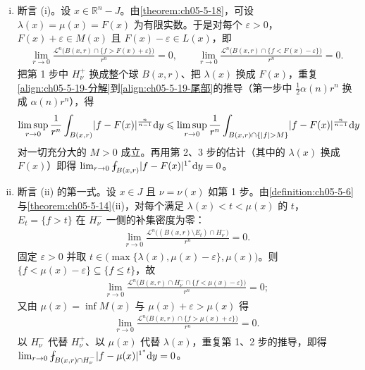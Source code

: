 \documentclass[../../main.tex]{subfiles}%
\begin{document}
\begin{remark}\label{remark:ch05-thm-5-19-论证三}
\begin{enumerate}[(i)]
\item 断言 (i)。设 $x\in\mathbb{R}^n-J$。由\cref{theorem:ch05-5-18}，可设 $\lambda(x)=\mu(x)=F(x)$ 为有限实数。于是对每个 $\varepsilon>0$，$F(x)+\varepsilon\in M(x)$ 且 $F(x)-\varepsilon\in L(x)$，即 %
\begin{align*}
\lim_{r\to0}\frac{\mathcal{L}^n\bigl(B(x,r)\cap\{f>F(x)+\varepsilon\}\bigr)}{r^n}=0,\qquad
\lim_{r\to0}\frac{\mathcal{L}^n\bigl(B(x,r)\cap\{f<F(x)-\varepsilon\}\bigr)}{r^n}=0 .
\end{align*}
把第 1 步中 $H_\nu^+$ 换成整个球 $B(x,r)$、把 $\lambda(x)$ 换成 $F(x)$，重复\eqref{align:ch05-5-19-分解}到\eqref{align:ch05-5-19-尾部}的推导（第一步中 $\frac12\alpha(n)r^n$ 换成 $\alpha(n)r^n$），得
\begin{align*}
\limsup_{r\to0}\frac{1}{r^n}\int_{B(x,r)}\lvert f-F(x)\rvert^{\frac{n}{n-1}}\mathrm{d} y
\leqslant\limsup_{r\to0}\frac{1}{r^n}\int_{B(x,r)\cap\{\lvert f\rvert>M\}}\lvert f-F(x)\rvert^{\frac{n}{n-1}}\mathrm{d} y
\end{align*}
对一切充分大的 $M>0$ 成立。再用第 2、3 步的估计（其中的 $\lambda(x)$ 换成 $F(x)$）即得 $\lim_{r\to0}\fint_{B(x,r)}\lvert f-F(x)\rvert^{1^{*}}\diff y=0$。
\item 断言 (ii) 的第一式。设 $x\in J$ 且 $\nu=\nu(x)$ 如第 1 步。由\cref{definition:ch05-5-6}与\cref{theorem:ch05-5-14}(ii)，对每个满足 $\lambda(x)<t<\mu(x)$ 的 $t$，$E_t=\{f>t\}$ 在 $H_\nu^-$ 一侧的补集密度为零：%
\begin{align*}
\lim_{r\to0}\frac{\mathcal{L}^n\bigl((B(x,r)\setminus E_t)\cap H_\nu^-\bigr)}{r^n}=0 .
\end{align*}
固定 $\varepsilon>0$ 并取 $t\in\bigl(\max\{\lambda(x),\mu(x)-\varepsilon\},\mu(x)\bigr)$。则 $\{f<\mu(x)-\varepsilon\}\subseteq\{f\leqslant t\}$，故
\begin{align*}
\lim_{r\to0}\frac{\mathcal{L}^n\bigl(B(x,r)\cap H_\nu^-\cap\{f<\mu(x)-\varepsilon\}\bigr)}{r^n}=0 ;
\end{align*}
又由 $\mu(x)=\inf M(x)$ 与 $\mu(x)+\varepsilon>\mu(x)$ 得
\begin{align*}
\lim_{r\to0}\frac{\mathcal{L}^n\bigl(B(x,r)\cap\{f>\mu(x)+\varepsilon\}\bigr)}{r^n}=0 .
\end{align*}
以 $H_\nu^-$ 代替 $H_\nu^+$、以 $\mu(x)$ 代替 $\lambda(x)$，重复第 1、2 步的推导，即得 $\lim_{r\to0}\fint_{B(x,r)\cap H_\nu^-}\lvert f-\mu(x)\rvert^{1^{*}}\diff y=0$。

\end{enumerate}
\end{remark}
\end{document}
